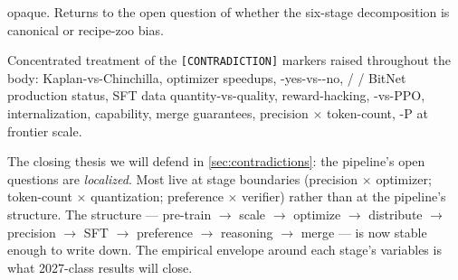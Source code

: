 \begin{description}
  opaque. Returns to the open question of whether the six-stage
  decomposition is canonical or recipe-zoo bias.
\item[\cref{sec:contradictions} --- Live contradictions.] Concentrated
  treatment of the \texttt{[CONTRADICTION]} markers raised throughout
  the body: Kaplan-vs-Chinchilla, optimizer speedups, -yes-vs--no,
   /  / BitNet production status, SFT data quantity-vs-quality,
  reward-hacking, -vs-PPO,  internalization,  capability,
  merge guarantees, precision $\times$ token-count, \textmu-P at
  frontier scale.
\end{description}

The closing thesis we will defend in \cref{sec:contradictions}: the
pipeline's open questions are \emph{localized}. Most live at stage
boundaries (precision $\times$ optimizer; token-count $\times$
quantization; preference $\times$ verifier) rather than at the
pipeline's structure. The structure --- pre-train $\to$ scale $\to$
optimize $\to$ distribute $\to$ precision $\to$ SFT $\to$ preference
$\to$ reasoning $\to$ merge --- is now stable enough to write down.
The empirical envelope around each stage's variables is what
2027-class results will close.
